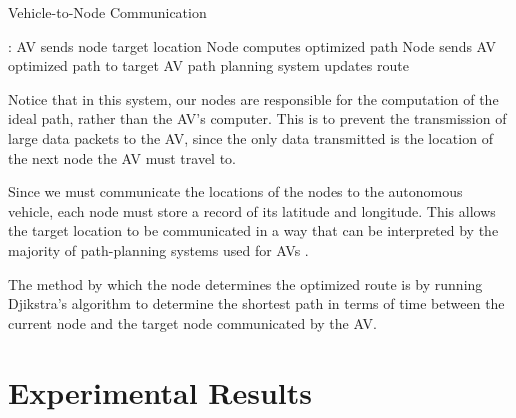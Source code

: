 \documentclass[conference]{IEEEtran}
\begin{document}
\begin{algorithm}
	\caption{Vehicle-to-Node Communication}\label{code:vtn-comm}
	\begin{algorithmic}[1]
	    :
	        \State AV sends node target location
	        \State Node computes optimized path
	        \State Node sends AV optimized path to target
	        \State AV path planning system updates route
	    \EndIf
	\end{algorithmic} 
\end{algorithm}

Notice that in this system, our nodes are responsible for the computation of the ideal path, rather than the AV's computer. This is to prevent the transmission of large data packets to the AV, since the only data transmitted is the location of the next node the AV must travel to.

Since we must communicate the locations of the nodes to the autonomous vehicle, each node must store a record of its latitude and longitude. This allows the target location to be communicated in a way that can be interpreted by the majority of path-planning systems used for AVs \cite{pathplanning}.

The method by which the node determines the optimized route is by running Djikstra's algorithm to determine the shortest path in terms of time between the current node and the target node communicated by the AV.

\section{Experimental Results}


\printbibliography
\end{document}
